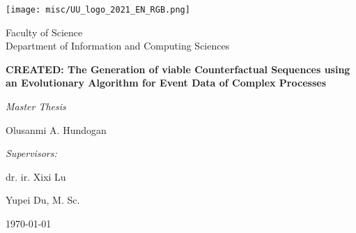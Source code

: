 \documentclass[./../paper.tex]{subfiles}
\begin{document}
\begin{titlepage}
    \centering
    \texttt{[image: misc/UU\_logo\_2021\_EN\_RGB.png]}\par
    Faculty of Science\\
    Department of Information and Computing Sciences

    \vspace{3cm}
    {\large\textbf{CREATED: The Generation of viable Counterfactual Sequences using an Evolutionary Algorithm for Event Data of Complex Processes}}\par\vspace{0.8cm}
    {\large\textit{Master Thesis}}\par\vspace{1cm}
    {\large Olusanmi A. Hundogan}\par

    \vfill

    \emph{Supervisors:}\par
    dr. ir. Xixi Lu\par
    Yupei Du, M. Sc.\par

    \today 
    \vspace{2cm}


\end{titlepage}
\end{document}
